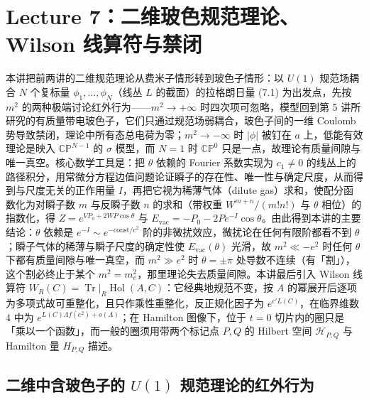 \section{Lecture 7：二维玻色规范理论、Wilson 线算符与禁闭}

\begin{keytakeaways}
本讲把前两讲的二维规范理论从费米子情形转到玻色子情形：以 $U(1)$ 规范场耦合 $N$ 个复标量 $\phi_1,\dots,\phi_N$（线丛 $L$ 的截面）的拉格朗日量 (7.1) 为出发点，先按 $m^2$ 的两种极端讨论红外行为——$m^2\to+\infty$ 时四次项可忽略，模型回到第 5 讲所研究的有质量带电玻色子，它们只通过规范场弱耦合，玻色子间的一维 Coulomb 势导致禁闭，理论中所有态总电荷为零；$m^2\to-\infty$ 时 $|\phi|$ 被钉在 $a$ 上，低能有效理论是映入 $\mathbb{CP}^{N-1}$ 的 $\sigma$ 模型，而 $N=1$ 时 $\mathbb{CP}^{0}$ 只是一点，故理论有质量间隙与唯一真空。核心数学工具是：把 $\theta$ 依赖的 Fourier 系数实现为 $c_1\neq0$ 的线丛上的路径积分，用常微分方程边值问题论证瞬子的存在性、唯一性与确定尺度，从而得到与尺度无关的正作用量 $I$，再把它视为稀薄气体（dilute gas）求和，使配分函数化为对瞬子数 $m$ 与反瞬子数 $n$ 的求和（带权重 $W^{m+n}/(m!n!)$ 与 $\theta$ 相位）的指数化，得 $Z=e^{VP_0+2WP\cos\theta}$ 与 $E_{\mathrm{vac}}=-P_0-2Pe^{-I}\cos\theta$。由此得到本讲的主要结论：$\theta$ 依赖是 $e^{-I}\sim e^{-\mathrm{const}/e^2}$ 阶的非微扰效应，微扰论在任何有限阶都看不到 $\theta$；瞬子气体的稀薄与瞬子尺度的确定性使 $E_{\mathrm{vac}}(\theta)$ 光滑，故 $m^2\ll-e^2$ 时任何 $\theta$ 下都有质量间隙与唯一真空，而 $m^2\gg e^2$ 时 $\theta=\pm\pi$ 处导数不连续（有「割」），这个割必终止于某个 $m^2=m_c^2$，那里理论失去质量间隙。本讲最后引入 Wilson 线算符 $W_R(C)=\operatorname{Tr}|_R\operatorname{Hol}(A,C)$：它经典地规范不变，按 $A$ 的幂展开后逐项为多项式故可重整化，且只作乘性重整化，反正规化因子为 $e^{c'L(C)}$，在临界维数 4 中为 $e^{L(C)\Lambda f(e^2)+o(\Lambda)}$；在 Hamilton 图像下，位于 $t=0$ 切片内的圈只是「乘以一个函数」，而一般的圈须用带两个标记点 $P,Q$ 的 Hilbert 空间 $\mathcal{H}_{P,Q}$ 与 Hamilton 量 $H_{P,Q}$ 描述。
\end{keytakeaways}

\subsection{二维中含玻色子的 $U(1)$ 规范理论的红外行为}


